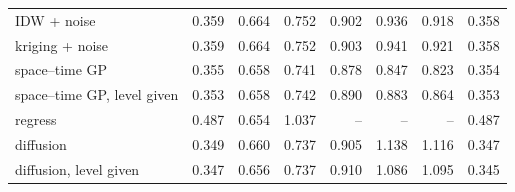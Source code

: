 \begin{tabular}{lrrrrrrr}
IDW + noise & 0.359 & 0.664 & 0.752 & 0.902 & 0.936 & 0.918 & 0.358 \\
kriging + noise & 0.359 & 0.664 & 0.752 & 0.903 & 0.941 & 0.921 & 0.358 \\
space--time GP & 0.355 & 0.658 & 0.741 & 0.878 & 0.847 & 0.823 & 0.354 \\
space--time GP, level given & 0.353 & 0.658 & 0.742 & 0.890 & 0.883 & 0.864 & 0.353 \\
regress & 0.487 & 0.654 & 1.037 & -- & -- & -- & 0.487 \\
diffusion & 0.349 & 0.660 & 0.737 & 0.905 & 1.138 & 1.116 & 0.347 \\
diffusion, level given & 0.347 & 0.656 & 0.737 & 0.910 & 1.086 & 1.095 & 0.345 \\
\bottomrule
\end{tabular}
